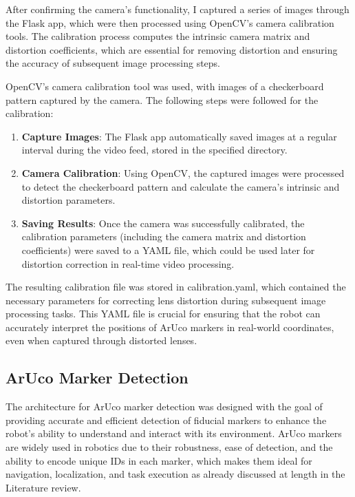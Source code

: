 After confirming the camera’s functionality, I captured a series of images through the Flask app, which were then processed using OpenCV’s camera calibration tools. The calibration process computes the intrinsic camera matrix and distortion coefficients, which are essential for removing distortion and ensuring the accuracy of subsequent image processing steps.

OpenCV's camera calibration tool was used, with images of a checkerboard pattern captured by the camera. The following steps were followed for the calibration:

\begin{enumerate}
	\item \textbf{Capture Images}: The Flask app automatically saved images at a regular interval during the video feed, stored in the specified directory.
	\item \textbf{Camera Calibration}: Using OpenCV, the captured images were processed to detect the checkerboard pattern and calculate the camera’s intrinsic and distortion parameters.
	\item \textbf{Saving Results}: Once the camera was successfully calibrated, the calibration parameters (including the camera matrix and distortion coefficients) were saved to a YAML file, which could be used later for distortion correction in real-time video processing.
\end{enumerate}

The resulting calibration file was stored in calibration.yaml, which contained the necessary parameters for correcting lens distortion during subsequent image processing tasks. This YAML file is crucial for ensuring that the robot can accurately interpret the positions of ArUco markers in real-world coordinates, even when captured through distorted lenses.


\subsection{ArUco Marker Detection}


The architecture for ArUco marker detection was designed with the goal of providing accurate and efficient detection of fiducial markers to enhance the robot’s ability to understand and interact with its environment. ArUco markers are widely used in robotics due to their robustness, ease of detection, and the ability to encode unique IDs in each marker, which makes them ideal for navigation, localization, and task execution as already discussed at length in the Literature review.


